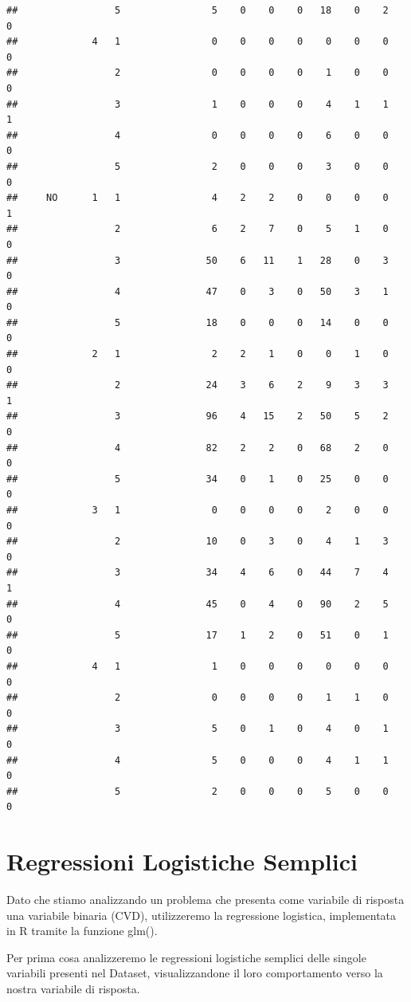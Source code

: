 \documentclass{article}\usepackage[]{graphicx}\usepackage[]{xcolor}
\makeatletter
\newenvironment{kframe}{%
 \def\at@end@of@kframe{}%
 \ifinner\ifhmode%
  \def\at@end@of@kframe{\end{minipage}}%
  \begin{minipage}{\columnwidth}%
 \fi\fi%
 \def\FrameCommand##1{\hskip\@totalleftmargin \hskip-\fboxsep
 \colorbox{shadecolor}{##1}\hskip-\fboxsep
     \hskip-\linewidth \hskip-\@totalleftmargin \hskip\columnwidth}%
 \MakeFramed {\advance\hsize-\width
   \@totalleftmargin\z@ \linewidth\hsize
   \@setminipage}}%
 {\par\unskip\endMakeFramed%
 \at@end@of@kframe}
\newenvironment{knitrout}{}{} %
\makeatother
\begin{document}
\begin{knitrout}
\begin{kframe}
\begin{verbatim}
##                 5                5    0    0    0   18    0    2    0
##             4   1                0    0    0    0    0    0    0    0
##                 2                0    0    0    0    1    0    0    0
##                 3                1    0    0    0    4    1    1    1
##                 4                0    0    0    0    6    0    0    0
##                 5                2    0    0    0    3    0    0    0
##     NO      1   1                4    2    2    0    0    0    0    1
##                 2                6    2    7    0    5    1    0    0
##                 3               50    6   11    1   28    0    3    0
##                 4               47    0    3    0   50    3    1    0
##                 5               18    0    0    0   14    0    0    0
##             2   1                2    2    1    0    0    1    0    0
##                 2               24    3    6    2    9    3    3    1
##                 3               96    4   15    2   50    5    2    0
##                 4               82    2    2    0   68    2    0    0
##                 5               34    0    1    0   25    0    0    0
##             3   1                0    0    0    0    2    0    0    0
##                 2               10    0    3    0    4    1    3    0
##                 3               34    4    6    0   44    7    4    1
##                 4               45    0    4    0   90    2    5    0
##                 5               17    1    2    0   51    0    1    0
##             4   1                1    0    0    0    0    0    0    0
##                 2                0    0    0    0    1    1    0    0
##                 3                5    0    1    0    4    0    1    0
##                 4                5    0    0    0    4    1    1    0
##                 5                2    0    0    0    5    0    0    0
\end{verbatim}
\end{kframe}
\end{knitrout}
    
\clearpage




\section{Regressioni Logistiche Semplici}
  Dato che stiamo analizzando un problema che presenta come variabile di 
  risposta una variabile binaria (CVD), utilizzeremo la regressione logistica, 
  implementata in R tramite la funzione glm(). \par
  Per prima cosa analizzeremo le regressioni logistiche semplici delle singole
  variabili presenti nel Dataset, visualizzandone il loro comportamento verso la
  nostra variabile di risposta.
  
\end{document}
